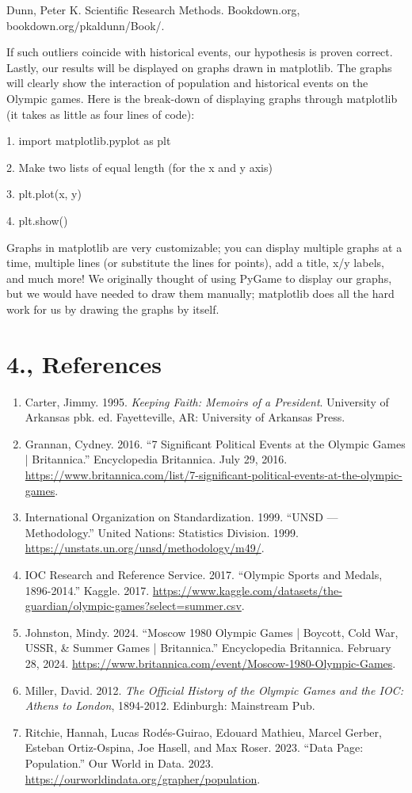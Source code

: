 \documentclass[fontsize=11pt]{article}
\begin{document}
Dunn, Peter K. Scientific Research Methods. Bookdown.org, bookdown.org/pkaldunn/Book/. 

If such outliers coincide with historical events, our hypothesis is proven correct. Lastly, our results will be displayed on graphs drawn in matplotlib. The graphs will clearly show the interaction of population and historical events on the Olympic games. Here is the break-down of displaying graphs through matplotlib (it takes as little as four lines of code): 

1. import matplotlib.pyplot as plt 

2. Make two lists of equal length (for the x and y axis) 

3. plt.plot(x, y) 

4. plt.show() 

Graphs in matplotlib are very customizable; you can display multiple graphs at a time, multiple lines (or substitute the lines for points), add a title, x/y labels, and much more! We originally thought of using PyGame to display our graphs, but we would have needed to draw them manually; matplotlib does all the hard work for us by drawing the graphs by itself. 

\section*{4., References}

\begin{enumerate}
    \item Carter, Jimmy. 1995. \textit{Keeping Faith: Memoirs of a President}. University of Arkansas pbk. ed. Fayetteville, AR: University of Arkansas Press.
    \item Grannan, Cydney. 2016. “7 Significant Political Events at the Olympic Games | Britannica.” Encyclopedia Britannica. July 29, 2016.  \url{https://www.britannica.com/list/7-significant-political-events-at-the-olympic-games}.
    \item International Organization on Standardization. 1999. “UNSD — Methodology.” United Nations: Statistics Division. 1999. \url{https://unstats.un.org/unsd/methodology/m49/}.
    \item IOC Research and Reference Service. 2017. “Olympic Sports and Medals, 1896-2014.” Kaggle. 2017. \url{https://www.kaggle.com/datasets/the-guardian/olympic-games?select=summer.csv}.
    \item Johnston, Mindy. 2024. “Moscow 1980 Olympic Games | Boycott, Cold War, USSR, \& Summer Games | Britannica.” Encyclopedia Britannica. February 28, 2024. \url{https://www.britannica.com/event/Moscow-1980-Olympic-Games}.
    \item Miller, David. 2012. \textit{The Official History of the Olympic Games and the IOC: Athens to London}, 1894-2012. Edinburgh: Mainstream Pub.
    \item Ritchie, Hannah, Lucas Rodés-Guirao, Edouard Mathieu, Marcel Gerber, Esteban Ortiz-Ospina, Joe Hasell, and Max Roser. 2023. “Data Page: Population.” Our World in Data. 2023. \url{https://ourworldindata.org/grapher/population}.
\end{enumerate}
\end{document}
